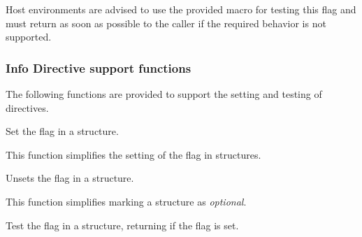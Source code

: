 \advicermstart
Host environments are advised to use the provided  macro for testing this flag and must return  as soon as possible to the caller if the required behavior is not supported.
\advicermend


\subsubsection{Info Directive support functions}

The following functions are provided to support the setting and testing of  directives.


Set the  flag in a  structure.


\begin{arglist}
\end{arglist}

This function simplifies the setting of the  flag in  structures.


Unsets the  flag in a  structure.


\begin{arglist}
\end{arglist}

This function simplifies marking a  structure as \textit{optional}.


Test the  flag in a  structure, returning  if the flag is set.

